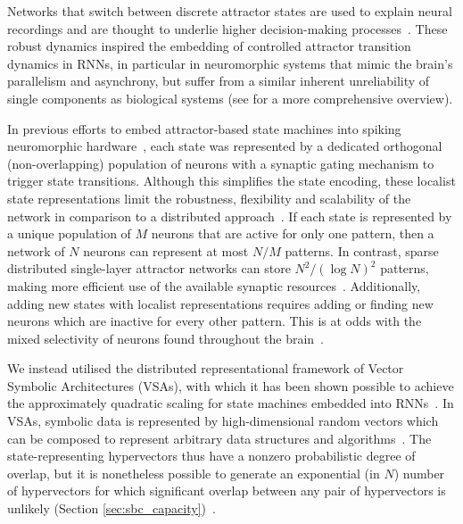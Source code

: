 Networks that switch between discrete attractor states are used to explain neural recordings and are thought to underlie higher decision-making processes~\cite{mante_context-dependent_2013,sussillo2013opening,miller_itinerancy_2016, dayan_simple_2008}.
These robust dynamics inspired the embedding of controlled attractor transition dynamics in RNNs, in particular in neuromorphic systems that mimic the brain's parallelism and asynchrony, but suffer from a similar inherent unreliability of single components as biological systems \cite{rutishauser_state-dependent_2009} (see \cite{cotteret_vector_2024} for a more comprehensive overview).

In previous efforts to embed attractor-based state machines into spiking neuromorphic hardware~\cite{neftci_synthesizing_2013, liang_neuromorphic_2019}, each state was represented by a dedicated orthogonal (non-overlapping) population of neurons with a synaptic gating mechanism to trigger state transitions.
Although this simplifies the state encoding, these localist state representations limit the robustness, flexibility and scalability of the network in comparison to a distributed approach~\cite{rumelhart_parallel_1986}.
If each state is represented by a unique population of $M$ neurons that are active for only one pattern, then a network of $N$ neurons can represent at most $N/M$ patterns.
In contrast, sparse distributed single-layer attractor networks can store $N^2 / (\log{N})^2$ patterns, making more efficient use of the available synaptic resources~\cite{amari_characteristics_1989, tsodyks_enhanced_1988, knoblauch_memory_2010}.
Additionally, adding new states with localist representations requires adding or finding new neurons which are inactive for every other pattern. This is at odds with the mixed selectivity of neurons found throughout the brain~\cite{fusi_why_2016}.

We instead utilised the distributed representational framework of Vector Symbolic Architectures (VSAs), with which it has been shown possible to achieve the approximately quadratic scaling for state machines embedded into RNNs~\cite{cotteret_vector_2024}.
In VSAs, symbolic data is represented by high-dimensional random vectors which can be composed to represent arbitrary data structures and algorithms~\cite{kleyko_survey_2022}.
The state-representing hypervectors thus have a nonzero probabilistic degree of overlap, but it is nonetheless possible to generate an exponential (in $N$) number of hypervectors for which significant overlap between any pair of hypervectors is unlikely (Section \ref{sec:sbc_capacity})~\cite{thomas_theoretical_2022, clarkson_capacity_2023}.

